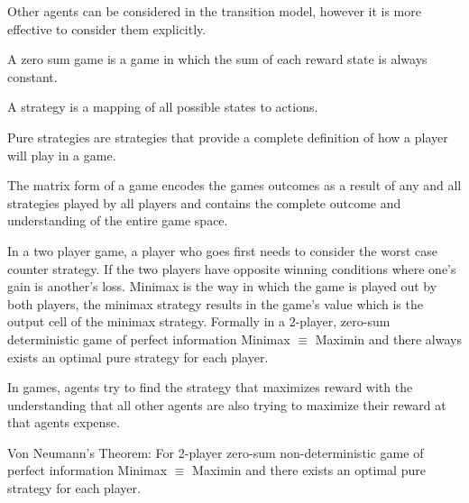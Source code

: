 \documentclass{article}
\begin{document}
Other agents can be considered in the transition model, however it is more 
effective to consider them explicitly.

A zero sum game is a game in which the sum of each reward state is always
constant. 

A strategy is a mapping of all possible states to actions.

Pure strategies are strategies that provide a complete definition of how a
player will play in a game.

The matrix form of a game encodes the games outcomes as a result of any and all
strategies played by all players and contains the complete outcome and
understanding of the entire game space. 

In a two player game, a player who goes first needs to consider the worst case
counter strategy. If the two players have opposite winning conditions where 
one's gain is another's loss. Minimax is the way in which the game is played out
by both players, the minimax strategy results in the game's value which is the
output cell of the minimax strategy. Formally in a 2-player, zero-sum
deterministic game of perfect information Minimax $\equiv$ Maximin and there 
always exists an optimal pure strategy for each player. 

In games, agents try to find the strategy that maximizes reward with the 
understanding that all other agents are also trying to maximize their reward at
that agents expense. 

Von Neumann's Theorem: For 2-player zero-sum non-deterministic game of perfect
information Minimax $\equiv$ Maximin and there exists an optimal pure strategy
for each player. 
\end{document}
